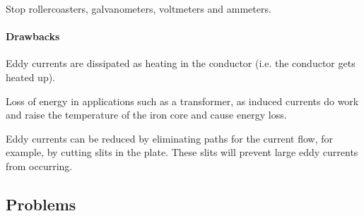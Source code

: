 Stop rollercoasters, galvanometers, voltmeters and ammeters.

\paragraph{Drawbacks}
Eddy currents are dissipated as heating in the conductor (i.e. the conductor gets heated up).

Loss of energy in applications such as a transformer, as induced currents do work and raise the temperature of the iron core and cause energy loss.

Eddy currents can be reduced by eliminating paths for the current flow, for example, by cutting slits in the plate. These slits will prevent large eddy currents from occurring.
\pagebreak

\subsection*{Problems}

\pagebreak